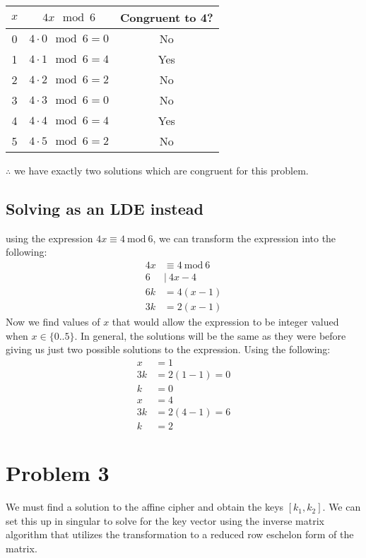 \documentclass[11pt]{article}
\begin{document}
\begin{center}
\begin{tabular}{|c|c|c|}
\hline
\( x \) & \( 4x \mod 6 \) & Congruent to 4? \\
\hline
0 & \( 4 \cdot 0 \mod 6 = 0 \) & No \\
1 & \( 4 \cdot 1 \mod 6 = 4 \) & Yes \\
2 & \( 4 \cdot 2 \mod 6 = 2 \) & No \\
3 & \( 4 \cdot 3 \mod 6 = 0 \) & No \\
4 & \( 4 \cdot 4 \mod 6 = 4 \) & Yes \\
5 & \( 4 \cdot 5 \mod 6 = 2 \) & No \\
\hline
\end{tabular}
\end{center}
\(\therefore\) we have exactly two solutions which are congruent for this problem.

\subsection{Solving as an LDE instead}
\label{sec:orgaba87d7}
using the expression \(4x \equiv 4\ \text{mod}\ 6\), we can transform the expression into the following:
\begin{align*}
4x &\equiv 4\ \text{mod}\ 6\\
6 &|\ 4x - 4\\
6k &= 4(x - 1)\\
3k &= 2(x - 1)
\end{align*}
Now we find values of $x$ that would allow the expression to be integer valued when $x \in \{0..5\}$. In general, the solutions will be the same as they were before giving us just two possible solutions to the expression. Using the following:
\begin{align*}
 x &= 1\\
 3k &= 2(1 - 1) = 0\\
 k &= 0 \\
 x &= 4\\
 3k &= 2(4 - 1) = 6\\
 k &= 2 
\end{align*}

\section{Problem 3}
\label{sec:orgb987cf0}
We must find a solution to the affine cipher and obtain the keys \([k_1, k_2]\). We can set this up in singular to solve for the key vector using the inverse matrix algorithm that utilizes the transformation to a reduced row eschelon form of the matrix.
\end{document}
